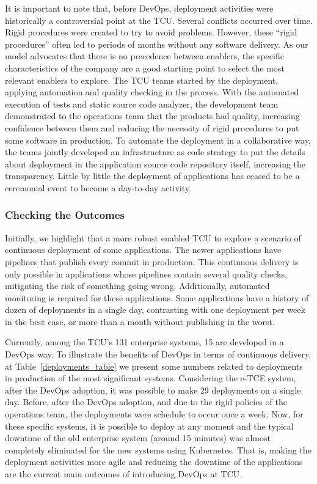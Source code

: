 It is important to note that, before DevOps, deployment activities were
historically a controversial point at the TCU. Several conflicts occurred over
time. Rigid procedures were created to try to avoid problems. However, these ``rigid
procedures'' often led to periods of months without any software delivery. As
our model advocates that there is no precedence between enablers, the specific
characteristics of the company are a good starting point to select the most
relevant enablers to explore. The TCU teams started by the deployment,
applying automation and quality checking in the process. With the automated
execution of tests and static source code analyzer, the development team
demonstrated to the operations team that the products had quality, increasing
confidence between them and reducing the necessity of rigid procedures to put
some software in production. To automate the deployment in a collaborative
way, the teams jointly developed an infrastructure as code strategy to put the
details about deployment in the application source code repository itself,
increasing the transparency. Little by little the deployment of applications has
ceased to be a ceremonial event to become a day-to-day activity.

\subsubsection{Checking the Outcomes}

Initially, we highlight that a more robust \cc enabled TCU to explore a scenario
of continuous deployment of some applications. The newer applications have
pipelines that publish every commit in production. This continuous delivery is
only possible in applications whose pipelines contain several quality checks,
mitigating the risk of something going wrong. Additionally, automated monitoring
is required for these applications. Some applications have a history of dozen
of deployments in a single day, contrasting with one deployment per week in the
best case, or more than a month without publishing in the worst.


Currently, among the TCU's 131 enterprise systems, 15 are developed in a DevOps way.
To illustrate the benefits of DevOps in terms of continuous delivery, at Table~\ref{deployments_table}
we present some numbers related to deployments
in production of the most significant systems. Considering the e-TCE system,
after the DevOps adoption, it was possible to make 29 deployments
on a single day. Before, after the DevOps adoption, and due to the
rigid policies of the operations team, the deployments were
schedule to occur once a week. Now, for these specific systems,
it is possible to deploy at any moment and the typical
downtime of the old enterprise system (around 15 minutes) was
almost completely eliminated for the new systems using
Kubernetes. That is, making the deployment activities
more agile and reducing the downtime of the applications are
the current main outcomes of introducing DevOps at TCU. 

